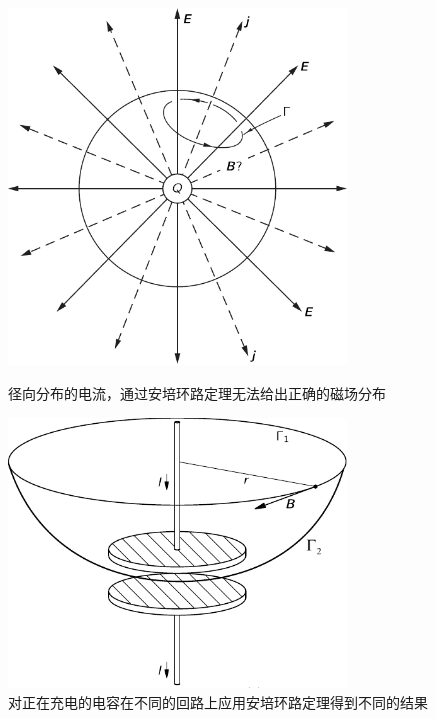 \begin{figure}
\begin{minipage}[t]{0.5\linewidth}
\centering

\includegraphics[width=0.8\textwidth]{images/em-theory-1.pdf}
\caption{径向分布的电流，通过安培环路定理无法给出正确的磁场分布}
\label{fig:em-theory-1}
\end{minipage}%
\begin{minipage}[t]{0.5\linewidth}
\begin{flushright}
\includegraphics[width=0.8\textwidth]{images/em-theory-2.pdf}
\caption{对正在充电的电容在不同的回路上应用安培环路定理得到不同的结果}
\label{fig: em-theory-2}
\end{flushright}


\end{minipage}
\end{figure}




